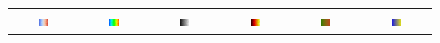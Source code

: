 \documentclass{llncs}
\begin{document}
\begin{figure}
\begin{tabular}{c@{\,}c@{\,}c@{\,}c@{\,}c@{\,}c}
    \includegraphics[width=0.16\textwidth]{images/Cool2WarmHfNoise} &
    \includegraphics[width=0.16\textwidth]{images/RainbowHfNoise} &
    \includegraphics[width=0.16\textwidth]{images/GrayscaleHfNoise} &
    \includegraphics[width=0.16\textwidth]{images/BlackBodyHfNoise} &
    \includegraphics[width=0.16\textwidth]{images/Green2RedHfNoise} &
    \includegraphics[width=0.16\textwidth]{images/Blue2YellowHfNoise} \\


\end{tabular}
\end{figure}
\end{document}
